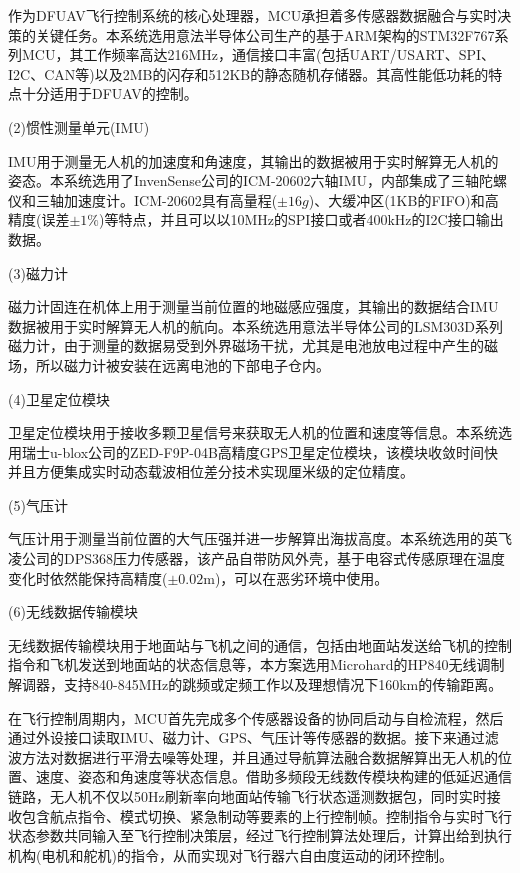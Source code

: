     作为DFUAV飞行控制系统的核心处理器，MCU承担着多传感器数据融合与实时决策的关键任务。本系统选用意法半导体公司生产的基于ARM架构的STM32F767系列MCU，其工作频率高达216MHz，通信接口丰富(包括UART/USART、SPI、I2C、CAN等)以及2MB的闪存和512KB的静态随机存储器。其高性能低功耗的特点十分适用于DFUAV的控制。

(2)惯性测量单元(IMU)

    IMU用于测量无人机的加速度和角速度，其输出的数据被用于实时解算无人机的姿态。本系统选用了InvenSense公司的ICM-20602六轴IMU，内部集成了三轴陀螺仪和三轴加速度计。ICM-20602具有高量程($\pm16g$)、大缓冲区(1KB的FIFO)和高精度(误差$\pm1\%$)等特点，并且可以以10MHz的SPI接口或者400kHz的I2C接口输出数据。

(3)磁力计

    磁力计固连在机体上用于测量当前位置的地磁感应强度，其输出的数据结合IMU数据被用于实时解算无人机的航向。本系统选用意法半导体公司的LSM303D系列磁力计，由于测量的数据易受到外界磁场干扰，尤其是电池放电过程中产生的磁场，所以磁力计被安装在远离电池的下部电子仓内。

(4)卫星定位模块

    卫星定位模块用于接收多颗卫星信号来获取无人机的位置和速度等信息。本系统选用瑞士u-blox公司的ZED-F9P-04B高精度GPS卫星定位模块，该模块收敛时间快并且方便集成实时动态载波相位差分技术实现厘米级的定位精度。
    
(5)气压计

    气压计用于测量当前位置的大气压强并进一步解算出海拔高度。本系统选用的英飞凌公司的DPS368压力传感器，该产品自带防风外壳，基于电容式传感原理在温度变化时依然能保持高精度($\pm0.02$m)，可以在恶劣环境中使用。

(6)无线数据传输模块

    无线数据传输模块用于地面站与飞机之间的通信，包括由地面站发送给飞机的控制指令和飞机发送到地面站的状态信息等，本方案选用Microhard的HP840无线调制解调器，支持840-845MHz的跳频或定频工作以及理想情况下160km的传输距离。

在飞行控制周期内，MCU首先完成多个传感器设备的协同启动与自检流程，然后通过外设接口读取IMU、磁力计、GPS、气压计等传感器的数据。接下来通过滤波方法对数据进行平滑去噪等处理，并且通过导航算法融合数据解算出无人机的位置、速度、姿态和角速度等状态信息。借助多频段无线数传模块构建的低延迟通信链路，无人机不仅以50Hz刷新率向地面站传输飞行状态遥测数据包，同时实时接收包含航点指令、模式切换、紧急制动等要素的上行控制帧。控制指令与实时飞行状态参数共同输入至飞行控制决策层，经过飞行控制算法处理后，计算出给到执行机构(电机和舵机)的指令，从而实现对飞行器六自由度运动的闭环控制。


